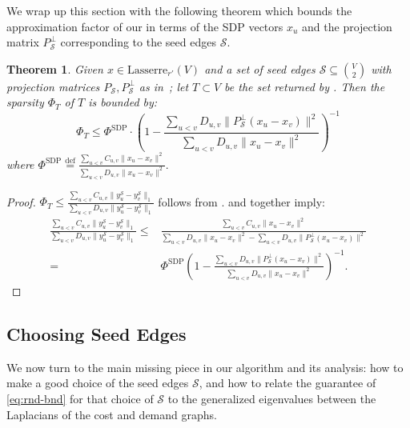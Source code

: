 \documentclass{article}
\def\triangleq{\overset{\mathrm{def}}{=}}
\newtheorem{theorem}{Theorem}[section]
\newcommand{\lasserreii}[2]{\mathrm{Lasserre}_{#1}(#2)}
\newcommand{\xvec}{\vec{x}} \newcommand{\yvec}{\vec{y}} \newcommand{\xmat}{\vec{X}} \newcommand{\ymat}{\vec{Y}} \newcommand{\zmat}{\vec{Z}}
\newcounter{alg-count}
\def\ngap{}
\def\vec{}
\newcommand{\sde}{{\mathcal{S}}}
\begin{document}
We wrap up this section with the following theorem which bounds the
approximation factor of our  in terms of the SDP
vectors $x_u$ and the projection matrix $P_{\sde}^\perp$ corresponding
to the seed edges $\sde$.
\newcommand{\scsdp}{\Phi^{\mathrm{SDP}}}
\begin{theorem}\label{thm:rnd-from-s}
  Given $\xvec \in \lasserreii{r'}{V}$ and a set of seed edges $\sde
  \subseteq \binom{V}{2}$ with projection matrices $P_{\sde},
  P_{\sde}^{\perp}$ as in~; let $T\subset V$ be the
  set returned by .
Then the sparsity $\Phi_T$ of $T$ is bounded by:
  \begin{equation}
    \Phi_T \le 
\scsdp \cdot \left(
      1 - \frac{\sum_{u<v} D_{u,v} \|P_{\sde}^{\perp} (\xvec_u- \xvec_v)\|^2}
      {\sum_{u<v} D_{u,v} \|\xvec_u - \xvec_v\|^2}
    \right)^{-1}
    \label{eq:rnd-bnd}
  \end{equation} where
  $\scsdp \triangleq 
   \frac{\sum_{u<v} C_{u,v} \|\xvec_u - \xvec_v\|^2 } 
        {\sum_{u<v} D_{u,v} \|\xvec_u - \xvec_v\|^2 }.$
\end{theorem}
\begin{proof}
  $\Phi_T \le \frac{\sum_{u<v} C_{u,v} \|\yvec^\sde_u -
    \yvec^\sde_v\|_1} {\sum_{u<v} D_{u,v} \|\yvec^\sde_u -
    \yvec^\sde_v\|_1}$ follows from .
 and  together imply:
\begin{align*}
  \frac{\sum_{u<v} C_{u,v} \|\yvec^\sde_u - \yvec^\sde_v\|_1}
  {\sum_{u<v} D_{u,v} \|\yvec^\sde_u - \yvec^\sde_v\|_1} \le&
  \frac{\sum_{u<v} C_{u,v} \|\xvec_u - \xvec_v\|^2} { \sum_{u<v}
    D_{u,v} \|\xvec_u - \xvec_v\|^2 - \sum_{u<v} D_{u,v}
    \|P_{\sde}^{\perp} (\xvec_u - \xvec_v)\|^2
  } \\
  = & \scsdp \left( 1 - \frac{\sum_{u<v} D_{u,v} \|P_{\sde}^{\perp}
      (\xvec_u- \xvec_v)\|^2} {\sum_{u<v} D_{u,v} \|\xvec_u -
      \xvec_v\|^2} \right)^{-1} \tag*{\qedhere}.
\end{align*}
\end{proof}
\ngap
\subsection{Choosing Seed Edges}
\label{sec:seed-selection}

We now turn to the main missing piece in our algorithm and its
analysis: how to make a good choice of the seed edges $\sde$, and how
to relate the guarantee of \cref{eq:rnd-bnd} for that choice of $\sde$
to the generalized eigenvalues between the Laplacians of the cost and
demand graphs.
\end{document}
